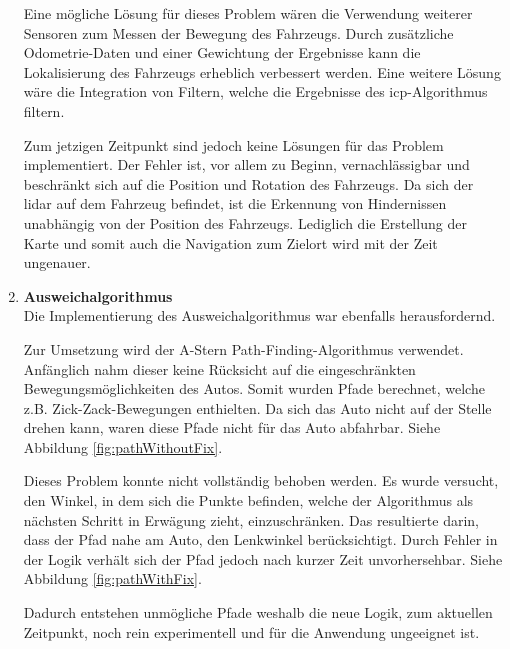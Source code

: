 \begin{enumerate}[leftmargin=*]
    Eine mögliche Lösung für dieses Problem wären die Verwendung weiterer Sensoren zum Messen der Bewegung des Fahrzeugs.
    Durch zusätzliche Odometrie-Daten und einer Gewichtung der Ergebnisse kann die Lokalisierung des Fahrzeugs erheblich verbessert werden.
    Eine weitere Lösung wäre die Integration von Filtern, welche die Ergebnisse des \ac{icp}-Algorithmus filtern.

    Zum jetzigen Zeitpunkt sind jedoch keine Lösungen für das Problem implementiert.
    Der Fehler ist, vor allem zu Beginn, vernachlässigbar und beschränkt sich auf die Position und Rotation des Fahrzeugs.
    Da sich der \ac{lidar} auf dem Fahrzeug befindet, ist die Erkennung von Hindernissen unabhängig von der Position des Fahrzeugs.
    Lediglich die Erstellung der Karte und somit auch die Navigation zum Zielort wird mit der Zeit ungenauer.

    \item \textbf{Ausweichalgorithmus} \\
    Die Implementierung des Ausweichalgorithmus war ebenfalls herausfordernd.
    
    Zur Umsetzung wird der A-Stern Path-Finding-Algorithmus verwendet.
    Anfänglich nahm dieser keine Rücksicht auf die eingeschränkten Bewegungsmöglichkeiten des Autos.
    Somit wurden Pfade berechnet, welche z.B. Zick-Zack-Bewegungen enthielten.
    Da sich das Auto nicht auf der Stelle drehen kann, waren diese Pfade nicht für das Auto abfahrbar.
    Siehe Abbildung \ref{fig:pathWithoutFix}.

    Dieses Problem konnte nicht vollständig behoben werden.
    Es wurde versucht, den Winkel, in dem sich die Punkte befinden, welche der Algorithmus als nächsten Schritt in Erwägung zieht, einzuschränken.
    Das resultierte darin, dass der Pfad nahe am Auto, den Lenkwinkel berücksichtigt.
    Durch Fehler in der Logik verhält sich der Pfad jedoch nach kurzer Zeit unvorhersehbar.
    Siehe Abbildung \ref{fig:pathWithFix}.

    Dadurch entstehen unmögliche Pfade weshalb die neue Logik, zum aktuellen Zeitpunkt, noch rein experimentell und für die Anwendung ungeeignet ist.


\end{enumerate}
